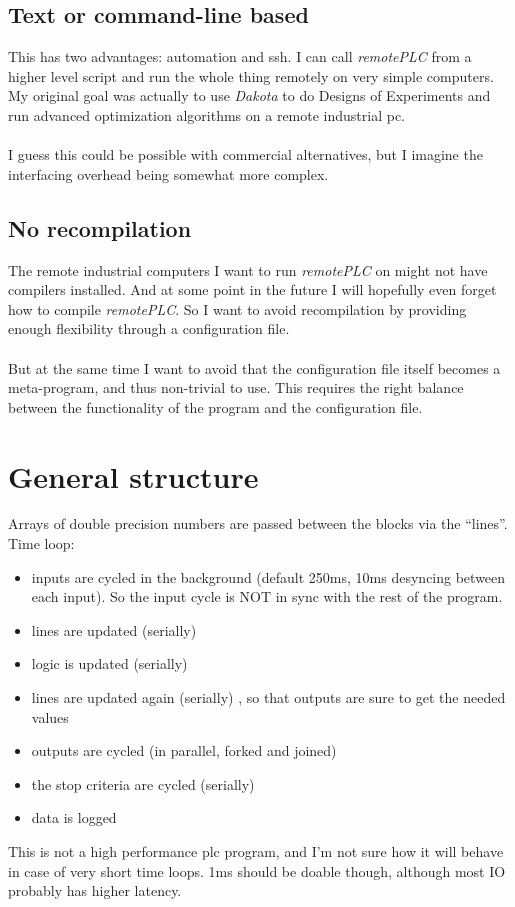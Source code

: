 \documentclass[a4paper]{article}
\begin{document}
\subsection{Text or command-line based}
This has two advantages: automation and ssh. I can call \textit{remotePLC} from a higher level script and run the whole thing remotely on very simple computers. My original goal was actually to use \textit{Dakota} to do Designs of Experiments and run advanced optimization algorithms on a remote industrial pc.\\\\
I guess this could be possible with commercial alternatives, but I imagine the interfacing overhead being somewhat more complex.
\subsection{No recompilation}
The remote industrial computers I want to run \textit{remotePLC} on might not have compilers installed. And at some point in the future I will hopefully even forget how to compile \textit{remotePLC}. So I want to avoid recompilation by providing enough flexibility through a configuration file.\\\\
But at the same time I want to avoid that the configuration file itself becomes a meta-program, and thus non-trivial to use. This requires the right balance between the functionality of the program and the configuration file.
\section{General structure}
Arrays of double precision numbers are passed between the blocks via the ``lines''.
Time loop:
\begin{itemize}
  \item inputs are cycled in the background (default 250ms, 10ms desyncing between each input). So the input cycle is NOT in sync with the rest of the program.
  \item lines are updated (serially)
  \item logic is updated (serially) 
  \item lines are updated again (serially) , so that outputs are sure to get the needed values 
  \item outputs are cycled (in parallel, forked and joined)
  \item the stop criteria are cycled (serially)
  \item data is logged
\end{itemize}
This is not a high performance plc program, and I'm not sure how it will behave in case of very short time loops. 1ms should be doable though, although most IO probably has higher latency.
\end{document}
